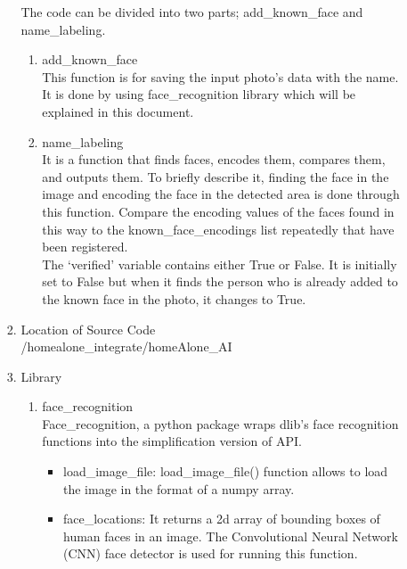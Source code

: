 \documentclass[conference]{IEEEtran}
\begin{document}
\begin{enumerate}[label=\arabic*.]
\begin{enumerate}[label=\arabic*.]
\begin{enumerate}[label=\alph*.]
        The code can be divided into two parts; add\_known\_face and name\_labeling. \\
        \begin{enumerate}[label=\roman*.]
            \item{\large{add\_known\_face}}\\
            This function is for saving the input photo’s data with the name. It is done by using face\_recognition library which will be explained in this document. \\
            \item{\large{name\_labeling}}\\
            It is a function that finds faces, encodes them, compares them, and outputs them. To briefly describe it, finding the face in the image and encoding the face in the detected area is done through this function. Compare the encoding values of the faces found in this way to the known\_face\_encodings list repeatedly that have been registered.\\
            The ‘verified’ variable contains either True or False. It is initially set to False but when it finds the person who is already added to the known face in the photo, it changes to True. \\
        \end{enumerate}
        \item{\large{Location of Source Code}}\\
        /homealone\_integrate/homeAlone\_AI\\
        \item{\large{Library}}\\
        \begin{enumerate}[label=\roman*.]
            \item{\large{face\_recognition}}\\
            Face\_recognition, a python package wraps dlib’s face recognition functions into the simplification version of API. \\
            \begin{itemize}
                \item load\_image\_file: load\_image\_file() function allows to load the image in the format of a numpy array.\\
                \item face\_locations: It returns a 2d array of bounding boxes of human faces in an image. The Convolutional Neural Network (CNN) face detector is used for running this function. \\

\end{itemize}
\end{enumerate}
\end{enumerate}
\end{enumerate}
\end{enumerate}
\end{document}
